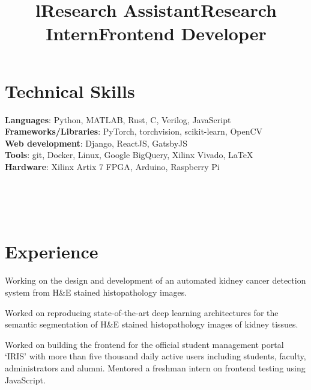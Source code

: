 \documentclass[margin]{res}
\begin{document}
\begin{resume}
    \section{Technical Skills}
      \textbf{Languages}: Python, MATLAB, Rust, C, Verilog, JavaScript
      \\
      \textbf{Frameworks/Libraries}: PyTorch, torchvision, scikit-learn, OpenCV
      \\
      \textbf{Web development}: Django, ReactJS, GatsbyJS
      \\
      \textbf{Tools}: git, Docker, Linux, Google BigQuery, Xilinx Vivado, \LaTeX
      \\
      \textbf{Hardware}: Xilinx Artix 7 FPGA, Arduino, Raspberry Pi


    \begin{format}
      \title{l}\\
      \\
      \body\\
    \end{format}

    \section{Experience}
      \title{\textbf{Research Assistant}}
      \begin{position}
        Working on the design and development of an automated kidney cancer detection system from H\&E stained histopathology images.
      \end{position}

      \title{\textbf{Research Intern}}
      \begin{position}
          Worked on reproducing state-of-the-art deep learning architectures for the semantic segmentation of H\&E stained histopathology images of kidney tissues.
      \end{position}

      \title{\textbf{Frontend Developer}}
      \begin{position}
        Worked on building the frontend for the official student management portal `IRIS' with more than five thousand daily active users including students, faculty, administrators and alumni.
        Mentored a freshman intern on frontend testing using JavaScript.
      \end{position}


\end{resume}
\end{document}
